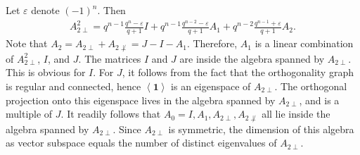 \documentclass[a4paper]{article}
\theoremstyle{definition}
\newcommand{\eps}{\varepsilon}
\newcommand{\vspan}[1]{\left \langle #1 \right \rangle}
\newcommand{\one}{\mathbf 1}
\begin{document}
Let $\eps$ denote $(-1)^n$.
Then
\begin{align}
 \label{EqOrthoHerm}
 A_{2\perp}^2 = q^{n-1} \frac{q^n-\eps}{q+1} I 
 + q^{n-1} \frac{q^{n-2}-\eps}{q+1} A_1
 + q^{n-2} \frac{q^{n-1}+\eps}{q+1} A_2.
\end{align}
Note that $A_2 = A_{2\perp} + A_{2\not\perp} = J - I - A_1$.
Therefore, $A_1$ is a linear combination of $A_{2\perp}^2$, $I$, and $J$.
The matrices $I$ and $J$ are inside the algebra spanned by $A_{2\perp}$.
This is obvious for $I$.
For $J$, it follows from the fact that the orthogonality graph is regular and connected, hence $\vspan \one$ is an eigenspace of $A_{2\perp}$.
The orthogonal projection onto this eigenspace lives in the algebra spanned by $A_{2\perp}$, and is a multiple of $J$.
It readily follows that $A_0=I, A_1, A_{2\perp}, A_{2\not\perp}$ all lie inside the algebra spanned by $A_{2\perp}$.
Since $A_{2\perp}$ is symmetric, the dimension of this algebra as vector subspace equals the number of distinct eigenvalues of $A_{2\perp}$.
\end{document}

